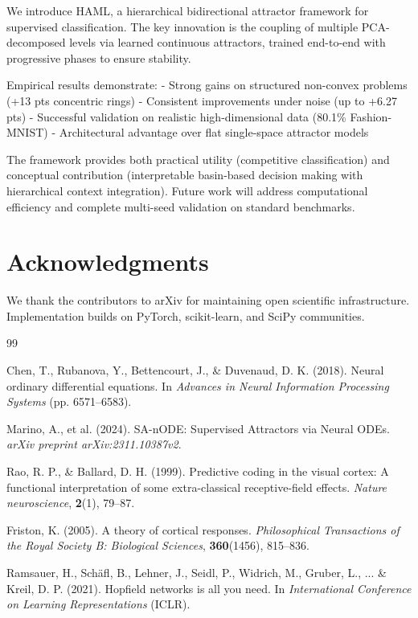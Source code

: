 \documentclass[11pt,a4paper]{article}
\begin{document}
We introduce HAML, a hierarchical bidirectional attractor framework for supervised classification. The key innovation is the coupling of multiple PCA-decomposed levels via learned continuous attractors, trained end-to-end with progressive phases to ensure stability. 

Empirical results demonstrate:
- Strong gains on structured non-convex problems (+13 pts concentric rings)
- Consistent improvements under noise (up to +6.27 pts)
- Successful validation on realistic high-dimensional data (80.1\% Fashion-MNIST)
- Architectural advantage over flat single-space attractor models

The framework provides both practical utility (competitive classification) and conceptual contribution (interpretable basin-based decision making with hierarchical context integration). Future work will address computational efficiency and complete multi-seed validation on standard benchmarks.

\section*{Acknowledgments}

We thank the contributors to arXiv for maintaining open scientific infrastructure. Implementation builds on PyTorch, scikit-learn, and SciPy communities.

\begin{thebibliography}{99}

Chen, T., Rubanova, Y., Bettencourt, J., \& Duvenaud, D. K. (2018). Neural ordinary differential equations. In \textit{Advances in Neural Information Processing Systems} (pp. 6571--6583).

Marino, A., et al. (2024). SA-nODE: Supervised Attractors via Neural ODEs. \textit{arXiv preprint arXiv:2311.10387v2}.

Rao, R. P., \& Ballard, D. H. (1999). Predictive coding in the visual cortex: A functional interpretation of some extra-classical receptive-field effects. \textit{Nature neuroscience}, \textbf{2}(1), 79--87.

Friston, K. (2005). A theory of cortical responses. \textit{Philosophical Transactions of the Royal Society B: Biological Sciences}, \textbf{360}(1456), 815--836.

Ramsauer, H., Schäfl, B., Lehner, J., Seidl, P., Widrich, M., Gruber, L., ... \& Kreil, D. P. (2021). Hopfield networks is all you need. In \textit{International Conference on Learning Representations} (ICLR).

\end{thebibliography}
\end{document}
